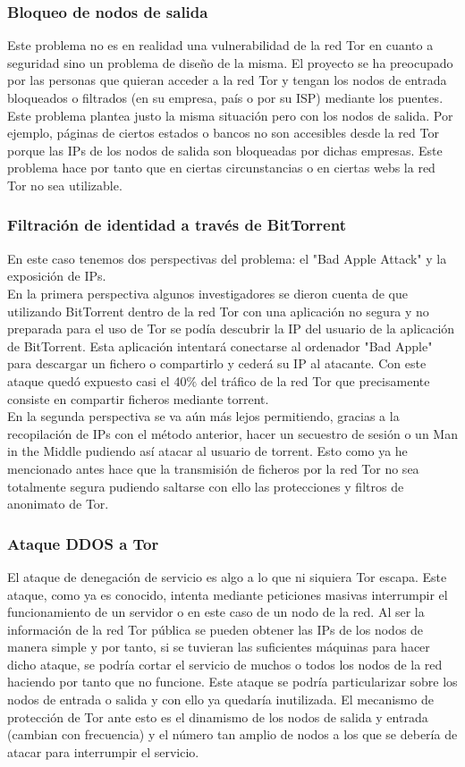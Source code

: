 \subsubsection{Bloqueo de nodos de salida}
Este problema no es en realidad una vulnerabilidad de la red Tor en cuanto a seguridad sino un problema de diseño de la misma. El proyecto se ha preocupado por las personas que quieran acceder a la red Tor y tengan los nodos de entrada bloqueados o filtrados (en su empresa, país o por su ISP) mediante los puentes. Este problema plantea justo la misma situación pero con los nodos de salida. Por ejemplo, páginas de ciertos estados o bancos no son accesibles desde la red Tor porque las IPs de los nodos de salida son bloqueadas por dichas empresas. Este problema hace por tanto que en ciertas circunstancias o en ciertas webs la red Tor no sea utilizable.

\subsubsection{Filtración de identidad a través de BitTorrent}
En este caso tenemos dos perspectivas del problema: el "Bad Apple Attack" y la exposición de IPs.\\
En la primera perspectiva algunos investigadores se dieron cuenta de que utilizando BitTorrent dentro de la red Tor con una aplicación no segura y no preparada para el uso de Tor se podía descubrir la IP del usuario de la aplicación de BitTorrent. Esta aplicación intentará conectarse al ordenador "Bad Apple" para descargar un fichero o compartirlo y cederá su IP al atacante. Con este ataque quedó expuesto casi el 40$\%$ del tráfico de la red Tor que precisamente consiste en compartir ficheros mediante torrent.\\
En la segunda perspectiva se va aún más lejos permitiendo, gracias a la recopilación de IPs con el método anterior, hacer un secuestro de sesión o un Man in the Middle pudiendo así atacar al usuario de torrent. Esto como ya he mencionado antes hace que la transmisión de ficheros por la red Tor no sea totalmente segura pudiendo saltarse con ello las protecciones y filtros de anonimato de Tor.

\subsubsection{Ataque DDOS a Tor}
El ataque de denegación de servicio es algo a lo que ni siquiera Tor escapa. Este ataque, como ya es conocido, intenta mediante peticiones masivas interrumpir el funcionamiento de un servidor o en este caso de un nodo de la red. Al ser la información de la red Tor pública se pueden obtener las IPs de los nodos de manera simple y por tanto, si se tuvieran las suficientes máquinas para hacer dicho ataque, se podría cortar el servicio de muchos o todos los nodos de la red haciendo por tanto que no funcione. Este ataque se podría particularizar sobre los nodos de entrada o salida y con ello ya quedaría  inutilizada. El mecanismo de protección de Tor ante esto es el dinamismo de los nodos de salida y entrada (cambian con frecuencia) y el número tan amplio de nodos a los que se debería de atacar para interrumpir el servicio.

